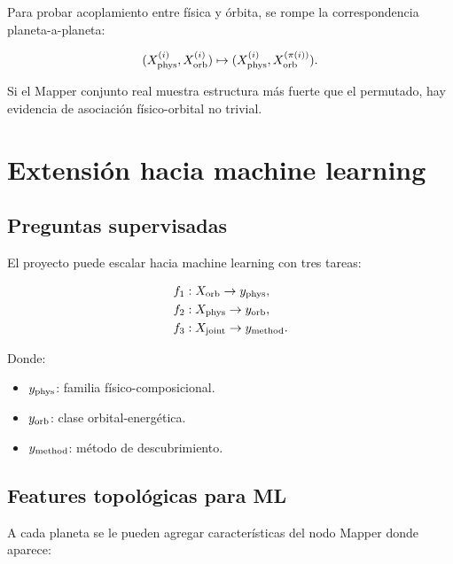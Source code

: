 \documentclass[11pt,letterpaper]{article}
\newcommand{\phys}{\rm phys}
\newcommand{\orb}{\rm orb}
\newcommand{\joint}{\rm joint}
\begin{document}
Para probar acoplamiento entre física y órbita, se rompe la correspondencia planeta-a-planeta:

\begin{equation}
(X_{\phys}^{(i)},X_{\orb}^{(i)})\mapsto (X_{\phys}^{(i)},X_{\orb}^{(\pi(i))}).
\end{equation}

Si el Mapper conjunto real muestra estructura más fuerte que el permutado, hay evidencia de asociación físico-orbital no trivial.

\section{Extensión hacia machine learning}

\subsection{Preguntas supervisadas}

El proyecto puede escalar hacia machine learning con tres tareas:

\begin{align}
f_1 &: X_{\orb}\to y_{\phys},\\
f_2 &: X_{\phys}\to y_{\orb},\\
f_3 &: X_{\joint}\to y_{\rm method}.
\end{align}

Donde:

\begin{itemize}
    \item $y_{\phys}$: familia físico-composicional.
    \item $y_{\orb}$: clase orbital-energética.
    \item $y_{\rm method}$: método de descubrimiento.
\end{itemize}

\subsection{Features topológicas para ML}

A cada planeta se le pueden agregar características del nodo Mapper donde aparece:
\end{document}
